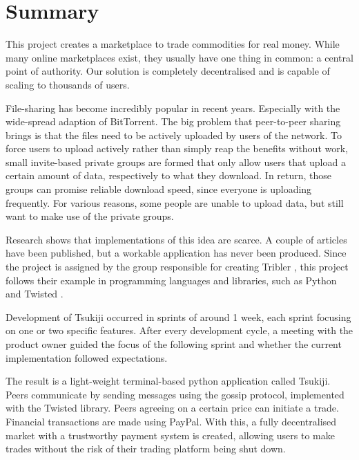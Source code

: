 \section{Summary} 
This project creates a marketplace to trade commodities for real money.
While many online marketplaces exist, they usually have one thing in common: a central point of authority.
Our solution is completely decentralised and is capable of scaling to thousands of users.

File-sharing has become incredibly popular in recent years. 
Especially with the wide-spread adaption of BitTorrent. 
The big problem that peer-to-peer sharing brings is that the files need to be actively uploaded by users of the network.
To force users to upload actively rather than simply reap the benefits without work, small invite-based private groups are formed that only allow users that upload a certain amount of data, respectively to what they download.
In return, those groups can promise reliable download speed, since everyone is uploading frequently.
For various reasons, some people are unable to upload data, but still want to make use of the private groups.

Research shows that implementations of this idea are scarce.
A couple of articles have been published, but a workable application has never been produced.
Since the project is assigned by the group responsible for creating Tribler \cite{tribler}, this project follows their example in programming languages and libraries, such as Python and Twisted \cite{twisted}.

Development of Tsukiji occurred in sprints of around 1 week, each sprint focusing on one or two specific features.
After every development cycle, a meeting with the product owner guided the focus of the following sprint and whether the current implementation followed expectations.

The result is a light-weight terminal-based python application called Tsukiji.
Peers communicate by sending messages using the gossip protocol, implemented with the Twisted library.
Peers agreeing on a certain price can initiate a trade.
Financial transactions are made using PayPal.
With this, a fully decentralised market with a trustworthy payment system is created, allowing users to make trades without the risk of their trading platform being shut down.